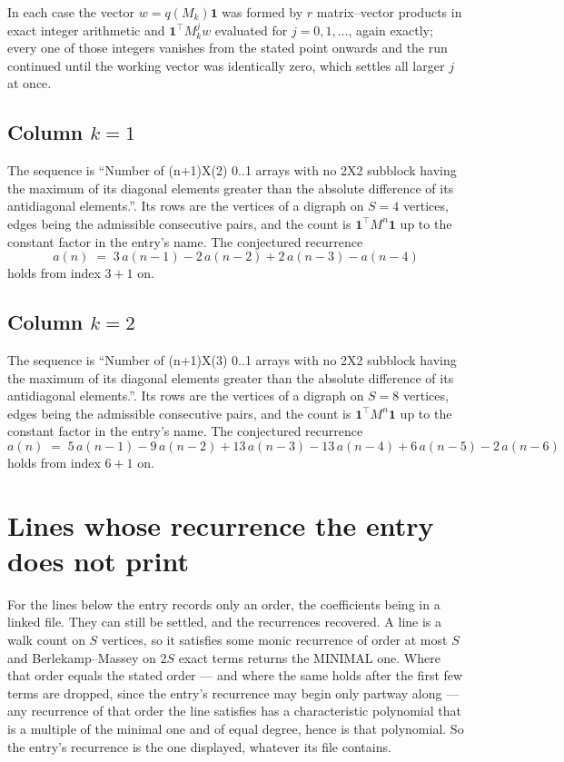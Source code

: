 \documentclass[11pt,a4paper]{article}
\theoremstyle{plain}
\theoremstyle{definition}
\begin{document}
In each case the vector $w=q(M_k)\mathbf{1}$ was formed by $r$ matrix--vector products in
exact integer arithmetic and $\mathbf{1}^{\!\top}M_k^{j}w$ evaluated for $j=0,1,\dots$,
again exactly; every one of those integers vanishes from the stated point onwards and the run
continued until the working vector was identically zero, which settles all larger $j$ at once.

\subsection*{Column $k$$=1$}
The sequence is ``Number of (n+1)X(2) 0..1 arrays with no 2X2 subblock having the maximum of its diagonal elements greater than the absolute difference of its antidiagonal elements.''. Its rows are the vertices of a digraph on
$S=4$ vertices, edges being the admissible consecutive pairs, and the count is
$\mathbf{1}^{\!\top}M^{n}\mathbf{1}$ up to the constant factor in the entry's name.
The conjectured recurrence
\[
a(n)\;=\;3\,a(n-1) - 2\,a(n-2) + 2\,a(n-3) - a(n-4)
\]
holds from index $3+1$ on.

\subsection*{Column $k$$=2$}
The sequence is ``Number of (n+1)X(3) 0..1 arrays with no 2X2 subblock having the maximum of its diagonal elements greater than the absolute difference of its antidiagonal elements.''. Its rows are the vertices of a digraph on
$S=8$ vertices, edges being the admissible consecutive pairs, and the count is
$\mathbf{1}^{\!\top}M^{n}\mathbf{1}$ up to the constant factor in the entry's name.
The conjectured recurrence
\[
a(n)\;=\;5\,a(n-1) - 9\,a(n-2) + 13\,a(n-3) - 13\,a(n-4) + 6\,a(n-5) - 2\,a(n-6)
\]
holds from index $6+1$ on.


\section{Lines whose recurrence the entry does not print}

For the lines below the entry records only an order, the coefficients being in a linked file.
They can still be settled, and the recurrences recovered. A line is a walk count on $S$
vertices, so it satisfies some monic recurrence of order at most $S$ and Berlekamp--Massey on
$2S$ exact terms returns the MINIMAL one. Where that order equals the stated order --- and
where the same holds after the first few terms are dropped, since the entry's recurrence may
begin only partway along --- any recurrence of that order the line satisfies has a
characteristic polynomial that is a multiple of the minimal one and of equal degree, hence is
that polynomial. So the entry's recurrence is the one displayed, whatever its file contains.
\end{document}
